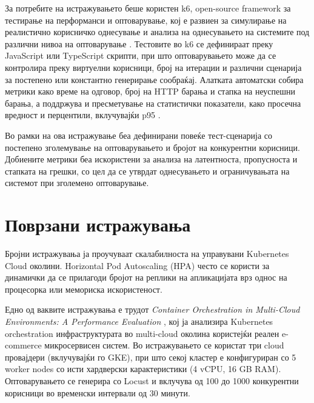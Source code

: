 \documentclass{article}
\begin{document}
За потребите на истражувањето беше користен k6, open-source framework за тестирање на перформанси и оптоварување, кој е развиен за симулирање на реалистично корисничко однесување и анализа на однесувањето на системите под различни нивоа на оптоварување \cite{grafanaK6}. Тестовите во k6 се дефинираат преку JavaScript или TypeScript скрипти, при што оптоварувањето може да се контролира преку виртуелни корисници, број на итерации и различни сценарија за постепено или константно генерирање сообраќај. Алатката автоматски собира метрики како време на одговор, број на HTTP барања и стапка на неуспешни барања, а поддржува и пресметување на статистички показатели, како просечна вредност и перцентили, вклучувајќи p95 \cite{grafanaK6Metrics}.

Во рамки на ова истражување беа дефинирани повеќе тест-сценарија со постепено зголемување на оптоварувањето и бројот на конкурентни корисници. Добиените метрики беа искористени за анализа на латентноста, пропусноста и стапката на грешки, со цел да се утврдат однесувањето и ограничувањата на системот при зголемено оптоварување.
\section{Поврзани истражувања}

Бројни истражувања ја проучуваат скалабилноста на управувани Kubernetes Cloud околини. Horizontal Pod Autoscaling (HPA) често се користи за динамички да се прилагоди бројот на реплики на апликацијата врз однос на процесорка или мемориска искористеност. 

Едно од ваквите истражувања е трудот \textit{Container Orchestration in Multi-Cloud Environments: A Performance Evaluation} \cite{multicloud2025}, кој ја анализира Kubernetes orchestration инфраструктурата во multi-cloud околина користејќи реален e-commerce микросервисен систем. Во истражувањето се користат три cloud провајдери (вклучувајќи го GKE), при што секој кластер е конфигуриран со 5 worker nodes со исти хардверски карактеристики (4 vCPU, 16 GB RAM). Оптоварувањето се генерира со Locust и вклучува од 100 до 1000 конкурентни корисници во временски интервали од 30 минути.
\end{document}
